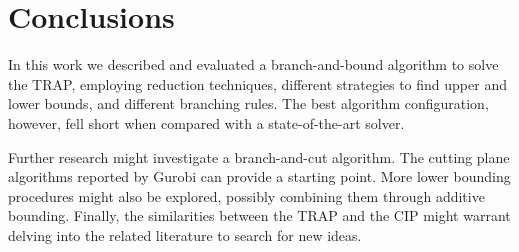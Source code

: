 \documentclass[runningheads]{llncs}
\begin{document}
\section{Conclusions}
\label{sec:conclusions}

In this work we described and evaluated a branch-and-bound algorithm to solve the TRAP, employing reduction techniques, different strategies to find upper and lower bounds, and different branching rules. The best algorithm configuration, however, fell short when compared with a state-of-the-art solver.

Further research might investigate a branch-and-cut algorithm. The cutting plane algorithms reported by Gurobi can provide a starting point. More lower bounding procedures might also be explored, possibly combining them through additive bounding. Finally, the similarities between the TRAP and the CIP might warrant delving into the related literature to search for new ideas. 



\end{document}
